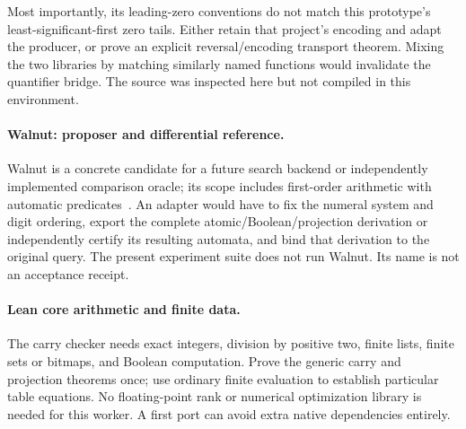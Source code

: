 Most importantly, its leading-zero conventions do not match this prototype's least-significant-first zero tails. Either retain that project's encoding and adapt the producer, or prove an explicit reversal/encoding transport theorem. Mixing the two libraries by matching similarly named functions would invalidate the quantifier bridge. The source was inspected here but not compiled in this environment.

\paragraph{Walnut: proposer and differential reference.}
Walnut is a concrete candidate for a future search backend or independently implemented comparison oracle; its scope includes first-order arithmetic with automatic predicates~\cite{walnut,mousavi}. An adapter would have to fix the numeral system and digit ordering, export the complete atomic/Boolean/projection derivation or independently certify its resulting automata, and bind that derivation to the original query. The present experiment suite does not run Walnut. Its name is not an acceptance receipt.

\paragraph{Lean core arithmetic and finite data.}
The carry checker needs exact integers, division by positive two, finite lists, finite sets or bitmaps, and Boolean computation. Prove the generic carry and projection theorems once; use ordinary finite evaluation to establish particular table equations. No floating-point rank or numerical optimization library is needed for this worker. A first port can avoid extra native dependencies entirely.

